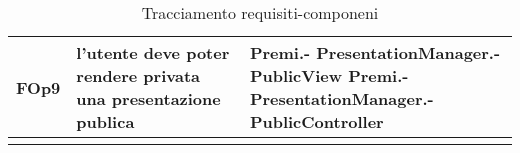 \begin{longtable}{|l|p{5cm}|p{7cm}|}
\hline
FOp9 & l'utente deve poter rendere privata una presentazione publica & Premi.- \linebreak PresentationManager.- \linebreak PublicView \linebreak Premi.- \linebreak PresentationManager.- \linebreak PublicController \linebreak \\
\hline
\caption{Tracciamento requisiti-componeni}
\end{longtable}